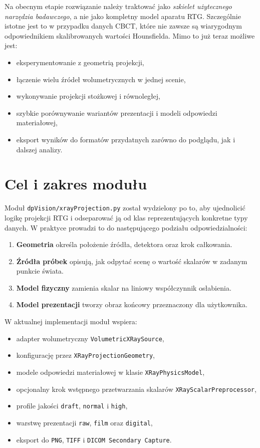 \documentclass[12pt,a4paper]{article}
\begin{document}
Na obecnym etapie rozwiązanie należy traktować jako \emph{szkielet użytecznego
narzędzia badawczego}, a nie jako kompletny model aparatu RTG. Szczególnie istotne
jest to w przypadku danych CBCT, które nie zawsze są wiarygodnym odpowiednikiem
skalibrowanych wartości Hounsfielda. Mimo to już teraz możliwe jest:
\begin{itemize}
  \item eksperymentowanie z geometrią projekcji,
  \item łączenie wielu źródeł wolumetrycznych w jednej scenie,
  \item wykonywanie projekcji stożkowej i równoległej,
  \item szybkie porównywanie wariantów prezentacji i modeli odpowiedzi materiałowej,
  \item eksport wyników do formatów przydatnych zarówno do podglądu, jak i dalszej analizy.
\end{itemize}

\section{Cel i zakres modułu}

Moduł \texttt{dpVision/xrayProjection.py} został wydzielony po to, aby ujednolicić
logikę projekcji RTG i odseparować ją od klas reprezentujących konkretne typy danych.
W praktyce prowadzi to do następującego podziału odpowiedzialności:
\begin{enumerate}[label=\arabic*.]
  \item \textbf{Geometria} określa położenie źródła, detektora oraz krok całkowania.
  \item \textbf{Źródła próbek} opisują, jak odpytać scenę o wartość skalarów w zadanym
        punkcie świata.
  \item \textbf{Model fizyczny} zamienia skalar na liniowy współczynnik osłabienia.
  \item \textbf{Model prezentacji} tworzy obraz końcowy przeznaczony dla użytkownika.
\end{enumerate}

W aktualnej implementacji moduł wspiera:
\begin{itemize}
  \item adapter wolumetryczny \texttt{VolumetricXRaySource},
  \item konfigurację przez \texttt{XRayProjectionGeometry},
  \item modele odpowiedzi materiałowej w klasie \texttt{XRayPhysicsModel},
  \item opcjonalny krok wstępnego przetwarzania skalarów
        \texttt{XRayScalarPreprocessor},
  \item profile jakości \texttt{draft}, \texttt{normal} i \texttt{high},
  \item warstwę prezentacji \texttt{raw}, \texttt{film} oraz \texttt{digital},
  \item eksport do \texttt{PNG}, \texttt{TIFF} i \texttt{DICOM Secondary Capture}.
\end{itemize}
\end{document}
